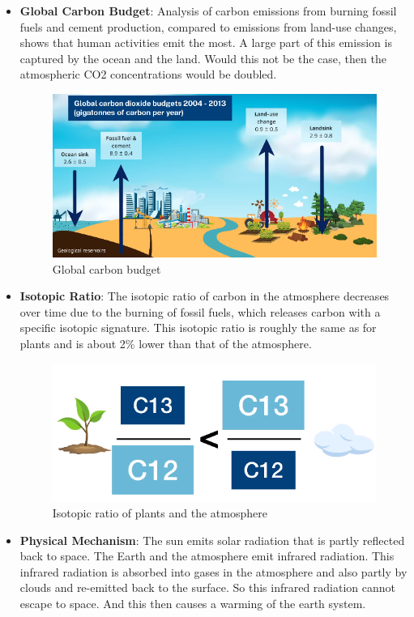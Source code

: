 \documentclass[../summary.tex]{subfiles}
\begin{document}
\begin{itemize}
	\item \textbf{Global Carbon Budget}: Analysis of carbon emissions from burning fossil fuels and cement production, compared to emissions from land-use changes, shows that human activities emit the most. A large part of this emission is captured by the ocean and the land. Would this not be the case, then the atmospheric CO2 concentrations would be doubled.
	
	\begin{figure}[H]
		\centering
		\includegraphics[width=0.7\linewidth]{images/carbon_budget}
		\caption{Global carbon budget}
		\label{fig:carbonbudget}
	\end{figure}
	
	\item \textbf{Isotopic Ratio}: The isotopic ratio of carbon in the atmosphere decreases over time due to the burning of fossil fuels, which releases carbon with a specific isotopic signature. This isotopic ratio is roughly the same as for plants and is about 2\% lower than that of the atmosphere. 
	
	\begin{figure}[H]
		\centering
		\includegraphics[width=0.7\linewidth]{images/isotopic_ratio}
		\caption{Isotopic ratio of plants and the atmosphere}
		\label{fig:isotopicratio}
	\end{figure}
	
	
	\item \textbf{Physical Mechanism}: The sun emits solar radiation that is partly reflected back to space. The Earth and the atmosphere emit infrared radiation.
	This infrared radiation is absorbed into gases in the atmosphere and also partly by clouds and re-emitted back to the surface. So this infrared radiation cannot escape to space. And this then causes a warming of the earth system.
	

\end{itemize}
\end{document}
